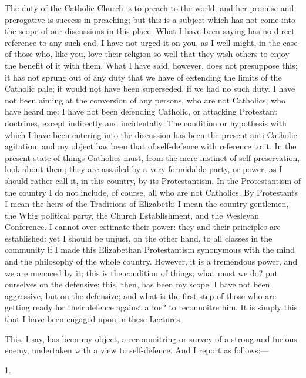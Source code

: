The duty of the Catholic Church is to preach to the world; and her promise and prerogative is success in
preaching; but this is a subject which has not come into
the scope of our discussions in this place. What I have
been saying has no direct reference to any such end. I
have not urged it on you, as I well might, in the case of
those who, like you, love their religion so well that
they wish others to enjoy the benefit of it with them.
What I have said, however, does not presuppose this; it
has not sprung out of any duty that we have of extending
the limits of the Catholic pale; it would not have been
superseded, if we had no such duty. I have not been
aiming at the conversion of any persons, who are not
Catholics, who have heard me: I have not been defending
Catholic, or attacking Protestant doctrines, except
indirectly and incidentally. The condition or hypothesis
with which I have been entering into the discussion has
been the present anti-Catholic agitation; and my object
has been that of self-defence with reference to it. In
the present state of things Catholics must, from the mere
instinct of self-preservation, look about them; they are
assailed by a very formidable party, or power, as I
should rather call it, in this country, by its
Protestantism. In the Protestantism of the country I do
not include, of course, all who are not Catholics. By
Protestants I mean the heirs of the Traditions of
Elizabeth; I mean the country gentlemen, the Whig
political party, the Church Establishment, and the
Wesleyan Conference. I cannot over-estimate their power:
they and their principles are established: yet I should
be unjust, on the other hand, to all classes in the
community if I made this Elizabethan Protestantism
synonymous with the mind and the philosophy of the whole
country. However, it is a tremendous power, and we are
menaced by it; this is the condition of things; what must
we do? put ourselves on the defensive; this, then, has
been my scope. I have not been aggressive, but on the
defensive; and what is the first step of those who are
getting ready for their defence against a foe? to
reconnoitre him. It is simply this that I have been
engaged upon in these Lectures.

This, I say, has been my object, a reconnoitring or
survey of a strong and furious enemy, undertaken with a
view to self-defence. And I report as follows:—

1.

